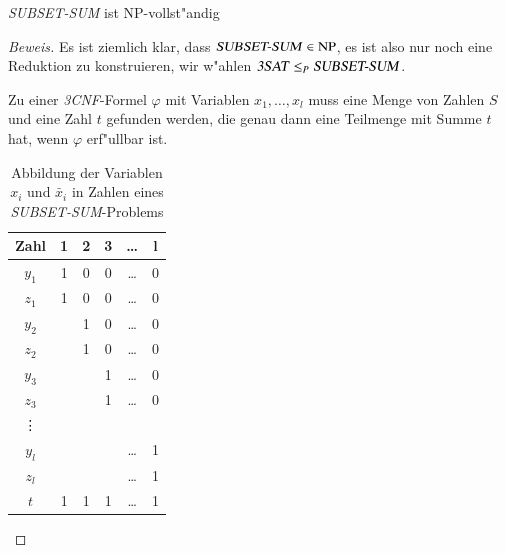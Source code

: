 \begin{satz}\textsl{SUBSET-SUM} ist NP-vollst"andig
\end{satz}

\begin{proof}[Beweis]
Es ist ziemlich klar, dass $\text{\textsl{SUBSET-SUM}}\in\operatorname{NP}$,
es ist also nur noch eine Reduktion zu konstruieren, wir w"ahlen
$\text{\textsl{3SAT}}\le_P\text{\textsl{SUBSET-SUM}}$.

Zu einer \textsl{3CNF}-Formel $\varphi$ mit Variablen $x_1,\dots,x_l$
muss eine Menge von Zahlen $S$ und eine Zahl $t$ gefunden werden,
die genau dann eine Teilmenge mit Summe $t$ hat, wenn $\varphi$
erf"ullbar ist.

\begin{table}
\begin{center}
\begin{tabular}{|c|ccccc|}
\hline
Zahl&1&2&3&\dots&l\\
\hline
$y_1$&1&0&0&\dots&0\\
$z_1$&1&0&0&\dots&0\\
$y_2$& &1&0&\dots&0\\
$z_2$& &1&0&\dots&0\\
$y_3$& & &1&\dots&0\\
$z_3$& & &1&\dots&0\\
\vdots&& & &     & \\
$y_l$& & & &\dots&1\\
$z_l$& & & &\dots&1\\
\hline
$t$&1&1&1&\dots&1\\
\hline
\end{tabular}
\end{center}
\caption{Abbildung der Variablen $x_i$ und $\bar x_i$ in Zahlen
eines \textsl{SUBSET-SUM}-Problems\label{subsetsumnumbers}}
\end{table}


\end{proof}
